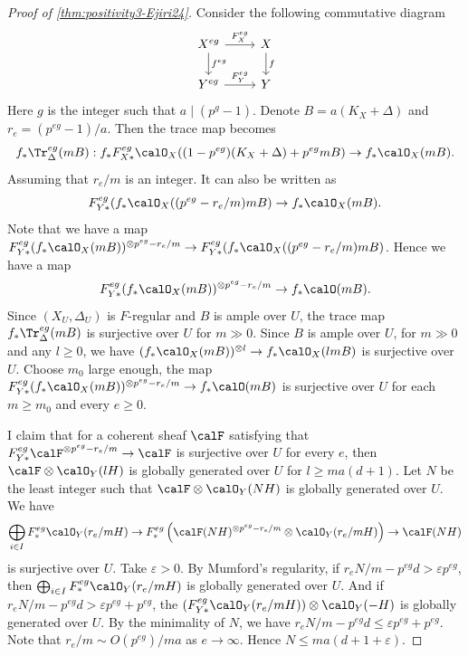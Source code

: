 \begin{proof}[Proof of \cref{thm:positivity3-Ejiri24}]
	Consider the following commutative diagram
	\[
		\begin{tikzcd}
			X^{eg} \arrow[d, "f^{eg}"] \arrow[r, "F_X^{eg}"] & X \arrow[d, "f"] \\
			Y^{eg} \arrow[r, "F_Y^{eg}"] & Y
		\end{tikzcd}
	\]
	Here $g$ is the integer such that $a \mid (p^g - 1)$.
	Denote $B = a(K_X + \Delta)$ and $r_e = (p^{eg} - 1)/a$.
	Then the trace map becomes
	\[ f_* \Tr_{\Delta}^{eg}(mB): f_* F_{X*}^{eg} \calO_X((1 - p^{eg})(K_X + \Delta) + p^{eg}mB) \to f_*\calO_X(mB). \]
	Assuming that $r_e/m$ is an integer.
	It can also be written as
	\[ F_{Y*}^{eg} (f_* \calO_X((p^{eg}-r_e/m)mB) \to f_*\calO_X(mB). \]
	Note that we have a map $F_{Y*}^{eg} (f_* \calO_X(mB))^{\otimes p^{eg}-r_e/m} \to F_{Y*}^{eg} (f_* \calO_X((p^{eg}-r_e/m)mB)$.
	Hence we have a map
	\[ F_{Y*}^{eg} (f_* \calO_X(mB))^{\otimes p^{eg}-r_e/m} \to f_*\calO(mB). \]
	Since $(X_U, \Delta_U)$ is $F$-regular and $B$ is ample over $U$, the trace map $f_* \Tr_{\Delta}^{eg}(mB)$ is surjective over $U$ for $m \gg 0$.
	Since $B$ is ample over $U$, for $m \gg 0$ and any $l \geq 0$, we have $(f_* \calO_X(mB))^{\otimes l} \to f_* \calO_X(lmB)$ is surjective over $U$.
	Choose $m_0$ large enough, the map $F_{Y*}^{eg} (f_* \calO_X(mB))^{\otimes p^{eg}-r_e/m} \to f_*\calO(mB)$ is surjective over $U$ for each $m \geq m_0$ and every $e \geq 0$.

	I claim that for a coherent sheaf $\calF$ satisfying that $F_{Y*}^{eg} \calF^{\otimes p^{eg}-r_e/m} \to \calF$ is surjective over $U$ for every $e$, then $\calF \otimes \calO_Y(lH)$ is globally generated over $U$ for $l \geq ma(d + 1)$.
	Let $N$ be the least integer such that $\calF \otimes \calO_Y(NH)$ is globally generated over $U$.
	We have
	\[ \bigoplus_{i \in I} F_*^{eg} \calO_Y(r_e/m H) \to F_*^{eg} \left( \calF(NH)^{\otimes p^{eg}-r_e/m} \otimes \calO_Y(r_e/m H) \right) \to \calF(NH) \]
	is surjective over $U$.
	Take $\varepsilon > 0$.
	By Mumford's regularity, if $r_eN/m - p^{eg}d > \varepsilon p^{eg}$, then $\bigoplus_{i \in I} F_*^{eg} \calO_Y(r_e/m H)$ is globally generated over $U$.
	And if $r_e N/m - p^{eg}d > \varepsilon p^{eg} + p^{eg}$, the $\left(F_{Y*}^{eg} \calO_Y(r_e/m H)\right)\otimes \calO_Y(-H)$ is globally generated over $U$.
	By the minimality of $N$, we have $r_e N/m - p^{eg}d \leq \varepsilon p^{eg} + p^{eg}$.
	Note that $r_e/m \sim O(p^{eg})/ma$ as $e \to \infty$.
	Hence $N \leq ma(d+1+\varepsilon)$.
\end{proof}


